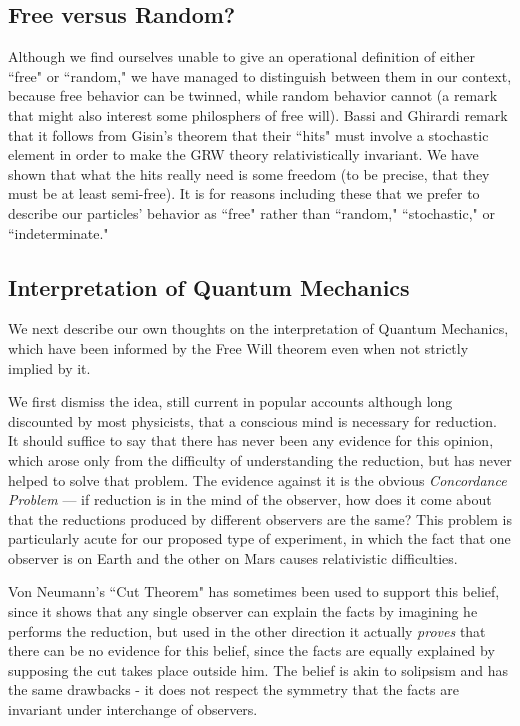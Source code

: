 \documentclass[12pt]{amsart}
\begin{document}
\subsection {Free versus Random?}

Although we find ourselves unable to give an operational definition of either ``free" or ``random," we have managed to distinguish between them in our context, because free
behavior can be twinned, while random behavior cannot (a remark that might also interest 
some philosphers of free will).  Bassi and Ghirardi remark that it follows from Gisin's theorem that their ``hits" must involve a stochastic element in order to make the GRW theory relativistically invariant.  We have shown that what the hits really need is some freedom (to be precise, that they must be at least semi-free). It is for reasons including these that we prefer to describe our particles' behavior as ``free" rather than ``random," ``stochastic," or ``indeterminate." 

\subsection {Interpretation of Quantum Mechanics}

We next describe our own thoughts on the interpretation of Quantum Mechanics,
which have been informed by the Free Will theorem even when not strictly implied
by it.  

We first dismiss the idea, still current in popular accounts although long discounted by most physicists, that a conscious mind is necessary for reduction.  It should suffice to say that there has never been any evidence for this opinion, which arose only from the difficulty of understanding the reduction, but has never helped to solve that problem.
The evidence against it is the obvious {\em Concordance Problem} --- if reduction is in the mind of the observer, how does it come about that the reductions produced by different observers are the same?  This problem is particularly acute for our proposed type of experiment, in which the fact that one observer is on Earth and the other on Mars
causes relativistic difficulties.

Von Neumann's ``Cut Theorem" has sometimes been used to support this belief, since it
shows that any single observer can explain the facts by imagining he performs the reduction, but used in the other direction it actually {\em proves} that there can 
be no evidence for this belief, since the facts are equally explained by supposing
the cut takes place outside him.  The belief is akin to solipsism and has the same drawbacks - it does not respect the
symmetry that the facts are invariant under interchange of observers.
\end{document}
